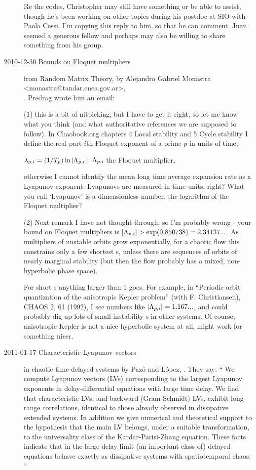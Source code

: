 \begin{description}
Re the codes, Christopher may still have something or be able to assist,
though he's been working on other topics during his postdoc at SIO with
Paola Cessi.  I'm copying this reply to him, so that he can comment.
Juan seemed a generous fellow and perhaps may also be willing to share
something from his group.

\item[2010-12-30 Bounds on Floquet multipliers]
from Random Matrix Theory,
by Alejandro Gabriel Monastra <monastra@tandar.cnea.gov.ar>,
\\
. Predrag
wrote him an email:

(1)
this is a bit of nitpicking, but I have to get it right, so let me know what you
think (and what authoritative references we are supposed to follow). In
Chaobook.org chapters
4 Local stability
and
5 Cycle stability
I define the real part $i$th Floquet exponent of a prime {\po} $p$
in units of time,

$ \lambda_{p,i} = (1/T_p) \ln |\Lambda_{p,i}| ,$
$\Lambda_{p,i}$ the Floquet multiplier,

otherwise I cannot identify the mean long time average expansion rate
as a Lyapunov exponent: Lyapunovs are measured in time units, right?
What you call `Lyapunov' is a dimensionless number,
the logarithm of the Floquet multiplier?

(2)
Next remark I have not thought through, so I'm probably wrong - your bound
on Floquet multipliers is  $|\Lambda_{p,i}| > \exp(0.850738) =2.34137...$. As
multipliers of unstable orbits grow exponentially, for a chaotic flow this
constrains only a few shortest {\po s}, unless there are sequences of
orbits of nearly marginal stability (but then the flow probably has a mixed,
non-hyperbolic phase space).

For short {\po s} anything larger than 1 goes. For example, in
{``Periodic orbit quantization} of the anisotropic Kepler problem''
(with F. Christiansen), CHAOS 2, 61 (1992), I see numbers like
$|\Lambda_{p,i}| = 1.167...$, and could probably dig up lots of small
instability {\po s} in other systems. Of course, anisotropic Kepler
is not a nice hyperbolic system at all, might work for something nicer.

\item[2011-01-17 Characteristic {Lyapunov} vectors]
in chaotic time-delayed systems
by Paz{\'o} and L{\'o}pez,
. They say:
``
We compute Lyapunov vectors (LVs) corresponding to the largest Lyapunov
exponents in delay-differential equations with large time delay. We find
that characteristic LVs, and backward (Gram-Schmidt) LVs, exhibit
long-range correlations, identical to those already observed in
dissipative extended systems. In addition we give numerical and
theoretical support to the hypothesis that the main LV belongs, under a
suitable transformation, to the universality class of the
Kardar-Parisi-Zhang equation. These facts indicate that in the large
delay limit (an important class of) delayed equations behave exactly as
dissipative systems with spatiotemporal chaos.
''


\end{description}
